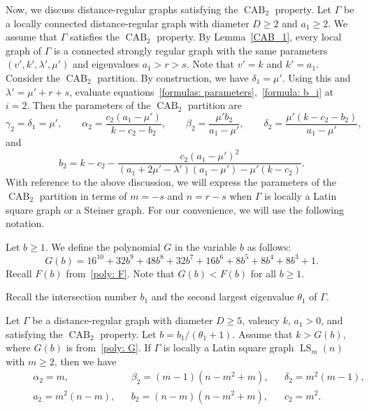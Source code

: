 Now, we discuss distance-regular graphs satisfying the $\operatorname{CAB}_2$ property.
Let $\Gamma$ be a locally connected distance-regular graph with diameter $D \geqslant 2$ and $a_1\geqslant 2$.
We assume that $\Gamma$ satisfies the $\operatorname{CAB}_2$ property. 
By Lemma~\ref{CAB_1}, every local graph of $\Gamma$ is a connected strongly regular graph with the same parameters $(v', k', \lambda', \mu')$ and eigenvalues $a_1 > r > s$.
Note that $v'=k$ and $k'=a_1$.
Consider the $\operatorname{CAB}_2$ partition. 
By construction, we have $\delta_1=\mu'$.
Using this and $\lambda' = \mu' + r + s$, evaluate equations~\eqref{formulas: parameters},~\eqref{formula: b_i} at $i=2$. 
Then the parameters of the $\operatorname{CAB}_2$ partition are 
\begin{equation}\label{constants2}
	\gamma_2 = \delta_{1}=\mu', \qquad
	\alpha_2 = \frac{c_2(a_1 - \mu')}{k-c_2-b_2}, \qquad 
	\beta_2 = \frac{\mu'b_2}{a_1-\mu'}, \qquad 
	\delta_2 = \frac{\mu'(k-c_2-b_2)}{a_1-\mu'},
\end{equation}
and
\begin{equation}\label{b2}
  b_2 = k-c_2 - \frac{c_2(a_1 -\mu')^2}{(a_1 +2\mu' -\lambda')(a_1 -\mu') -\mu'(k-c_2)}.
\end{equation}
With reference to the above discussion, we will express the parameters of the $\operatorname{CAB}_2$ partition in terms of $m=-s$ and $n=r-s$ when $\Gamma$ is locally a Latin square graph or a Steiner graph.
For our convenience, we will use the following notation.
\begin{nota}
Let $b \geqslant 1$. We define the polynomial $G$ in the variable $b$ as follows:
\begin{equation}\label{poly: G}
	G(b) 
	= 16^{10} + 32b^9 + 48b^8 + 32b^7 + 16b^6 + 8b^5 + 8b^4 + 8b^3 + 1.
\end{equation}
Recall $F(b)$ from~\eqref{poly: F}.
Note that $G(b) < F(b)$ for all $b \geqslant 1$.
\end{nota}

Recall the intersection number $b_1$ and the second largest eigenvalue $\theta_1$ of $\Gamma$.

\begin{prop}\label{LS}
Let $\Gamma$ be a distance-regular graph with diameter $D \geqslant 5$, valency $k$, $a_1 > 0$, and satisfying the $\operatorname{CAB}_2$ property. 
Let $b=b_1/(\theta_1+1)$.
Assume that $k > G(b)$, where $G(b)$ is from~\eqref{poly: G}.
If $\Gamma$ is locally a Latin square graph $\operatorname{LS}_m(n)$ with $m \geqslant 2$,
then we have
\begin{align}
	&& & \alpha_2 =m, && \beta_2 =(m-1)(n-m^2+m), && \delta_2 = m^2(m-1), && \label{lem:LS eq(1)}\\
	&& & a_2 = m^2(n-m), && b_2 = (n-m)(n-m^2+m), && c_2 = m^2. && \label{lem:LS eq(2)}
\end{align}
\end{prop}


